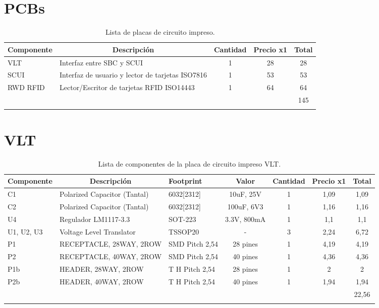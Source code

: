 \section{PCBs}
\begin{longtable}{|l|l|c|c|c|}
\hline
\multicolumn{1}{|c|}{\textbf{Componente}} & \multicolumn{1}{c|}{\textbf{Descripción}} & \textbf{Cantidad} & \textbf{Precio x1} & \textbf{Total} \\ \hline
VLT & Interfaz entre SBC y SCUI & 1 & 28 & 28 \\ \hline
SCUI & Interfaz de usuario y lector de tarjetas ISO7816 & 1 & 53 & 53 \\ \hline
RWD RFID & Lector/Escritor de tarjetas RFID ISO14443 & 1 & 64 & 64 \\ \hline
 &  & \multicolumn{1}{l|}{} & \multicolumn{1}{l|}{} & 145 \\ \hline
\caption{Lista de placas de circuito impreso.}
\label{}
\end{longtable}


\section{VLT}
\begin{longtable}{|l|p{3cm}|p{2cm}|c|c|c|c|}
\hline
\multicolumn{1}{|c|}{\textbf{Componente}} & \multicolumn{1}{c|}{\textbf{Descripción}} & \textbf{ Footprint} & \textbf{Valor} & \textbf{Cantidad} & \textbf{Precio x1} & \textbf{Total} \\ \hline
C1 & Polarized Capacitor (Tantal) & 6032[2312] & 10uF, 25V & 1 & 1,09 & 1,09 \\ \hline
C2 & Polarized Capacitor (Tantal) & 6032[2312] & 100uF, 6V3 & 1 & 1,16 & 1,16 \\ \hline
U4 & Regulador LM1117-3.3 & SOT-223 & 3.3V, 800mA & 1 & 1,1 & 1,1 \\ \hline
U1, U2, U3 & Voltage Level Translator & TSSOP20 & - & 3 & 2,24 & 6,72 \\ \hline
P1 & RECEPTACLE, 28WAY, 2ROW & SMD  Pitch 2,54 & 28 pines & 1 & 4,19 & 4,19 \\ \hline
P2 & RECEPTACLE, 40WAY, 2ROW & SMD  Pitch 2,54 & 40 pines & 1 & 4,36 & 4,36 \\ \hline
P1b & HEADER, 28WAY, 2ROW & T H Pitch 2,54 & 28 pines & 1 & 2 & 2 \\ \hline
P2b & HEADER, 40WAY, 2ROW & T H Pitch 2,54 & 40 pines & 1 & 1,94 & 1,94 \\ \hline
 &  & \multicolumn{1}{l|}{} & \multicolumn{1}{l|}{} & \multicolumn{1}{l|}{} & \multicolumn{1}{l|}{} & 22,56 \\ \hline
\caption{Lista de componentes de la placa de circuito impreso VLT.}
\label{}
\end{longtable}


